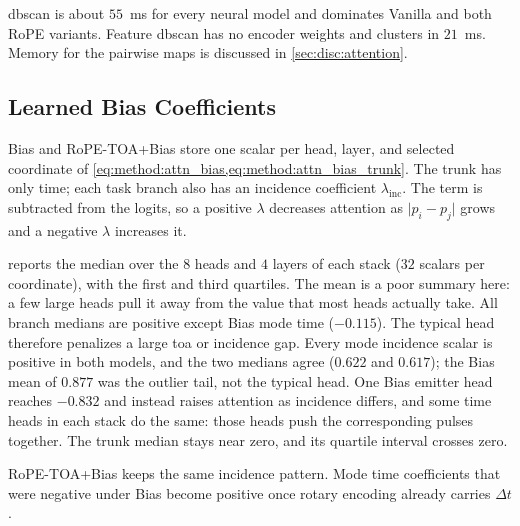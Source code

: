 \Gls{dbscan} is about $55$~ms for every neural model and dominates Vanilla and both RoPE variants.
Feature \gls{dbscan} has no encoder weights and clusters in $21$~ms.
Memory for the pairwise maps is discussed in \cref{sec:disc:attention}.

\subsection{Learned Bias Coefficients}\label{sec:exp:results:bias_coef}

Bias and RoPE-TOA+Bias store one scalar per head, layer, and selected coordinate of \cref{eq:method:attn_bias,eq:method:attn_bias_trunk}.
The trunk has only time; each task branch also has an incidence coefficient $\lambda_{\mathrm{inc}}$.
The term is subtracted from the logits, so a positive $\lambda$ decreases attention as $\lvert p_i-p_j\rvert$ grows and a negative $\lambda$ increases it.

 reports the median over the $8$ heads and $4$ layers of each stack ($32$ scalars per coordinate), with the first and third quartiles.
The mean is a poor summary here: a few large heads pull it away from the value that most heads actually take.
All branch medians are positive except Bias mode time ($-0.115$).
The typical head therefore penalizes a large \gls{toa} or incidence gap.
Every mode incidence scalar is positive in both models, and the two medians agree ($0.622$ and $0.617$); the Bias mean of $0.877$ was the outlier tail, not the typical head.
One Bias emitter head reaches $-0.832$ and instead raises attention as incidence differs, and some time heads in each stack do the same: those heads push the corresponding pulses together.
The trunk median stays near zero, and its quartile interval crosses zero.

RoPE-TOA+Bias keeps the same incidence pattern.
Mode time coefficients that were negative under Bias become positive once rotary encoding already carries $\Delta t$.

